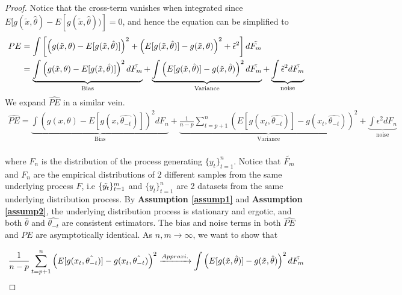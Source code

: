 \documentclass[12pt, oneside]{amsart}
\theoremstyle{definition}
\theoremstyle{remark}
\numberwithin{equation}{section}
\begin{document}
\begin{proof}
Notice that the cross-term vanishes when integrated since $E[ g(\tilde{x},\hat{\theta}) - E[g(\tilde{x},\hat{\theta}))] = 0$, and hence the equation can be simplified to
\begin{align*}
PE  &= \int \left[ \left(g(\Tilde{x}, \theta) - E[g(\Tilde{x}, \hat{\theta})] \right)^2 + \left(E[g(\Tilde{x}, \hat{\theta})] - g(\Tilde{x},\theta)\right)^2 + \Tilde{\epsilon}^2 \right] d\Tilde{F_m}\\ 
    &= \underbrace{\int  \left(g(\Tilde{x}, \theta) - E[g(\Tilde{x}, \hat{\theta})] \right)^2 d\Tilde{F_m}}_\text{Bias} + \underbrace{\int \left(E[g(\Tilde{x}, \hat{\theta})] - g(\Tilde{x},\hat{\theta})\right)^2 d\Tilde{F_m}}_\text{Variance} + \underbrace{\int \Tilde{\epsilon}^2  d\Tilde{F_m}}_\text{noise}\\  
\end{align*}
We expand $\hat{PE}$ in a similar vein. 
\begin{align*}
     \hat{PE} = \underbrace{\int  \left(g(x, \theta) - E[g(x, \hat{\theta_{-t}})] \right)^2 dF_n}_\text{Bias} + \underbrace{ \frac{1}{n-p}\sum_{t=p+1}^n \left( E[g(x_t, \hat{\theta_{-t}})] - g(x_t, \hat{\theta_{-t}}) \right)^2     }_\text{Variance} + \underbrace{\int \epsilon^2dF_n}_\text{noise}\\  
\end{align*}

where $F_n$ is the distribution of the process generating $\{y_t\}^n_{t=1}$. Notice that $\tilde{F_m}$ and $F_n$ are the empirical distributions of $2$ different samples from the same underlying process $F$, i.e $\{\Tilde{y_t}\}_{t=1}^m$ and $\{y_t\}_{t=1}^n$ are 2 datasets from the same underlying distribution process. By \textbf{Assumption \ref{assump1}} and \textbf{Assumption \ref{assump2}}, the underlying distribution process is stationary and ergotic, and  both $\hat{\theta}$ and $\hat{\theta_{-t}}$ are consistent estimators. The bias and noise terms in both $\hat{PE}$ and $PE$ are asymptotically identical. As $n, m \rightarrow \infty $, we want to show that

\begin{equation}\label{equation6}
   \frac{1}{n-p}\sum_{t=p+1}^n \left( E[g(x_t, \hat{\theta_{-t}})] - g(x_t, \hat{\theta_{-t}}) \right)^2 \xrightarrow{Approxi.} \int \left(E[g(\Tilde{x}, \hat{\theta})] - g(\Tilde{x},\hat{\theta})\right)^2 d\tilde{F_m} 
\end{equation}


\end{proof}
\end{document}
